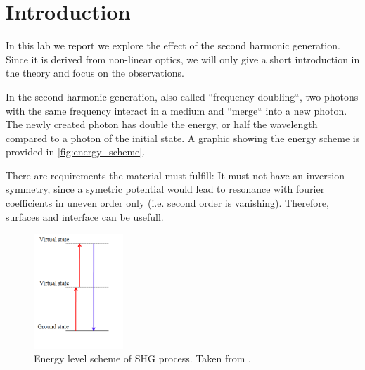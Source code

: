 \section{Introduction}
\label{sec:introduction}
In this lab we report we explore the effect of the second harmonic generation. Since it is derived
from non-linear optics, we will only give a short introduction in the theory and focus on the
observations.

In the second harmonic generation, also called ``frequency doubling``, two photons with the same
frequency interact in a
medium and ``merge`` into a new photon. The newly created photon has double the energy, or half the wavelength
compared to a photon of the initial state. A graphic showing the energy scheme is provided in
\autoref{fig:energy_scheme}.

There are requirements the material must fulfill: It must not have an inversion symmetry, since a
symetric potential would lead to resonance with fourier coefficients in uneven order only (i.e.
second order is vanishing). Therefore, surfaces and interface can be usefull.
\begin{figure}
    \centering
    \includegraphics[width=0.3\textwidth]{media/Energy_level_scheme_of_SHG.png}
    \caption{Energy level scheme of SHG process. Taken from \cite{energy_level_scheme}.}
    \label{fig:energy_scheme}
\end{figure}

